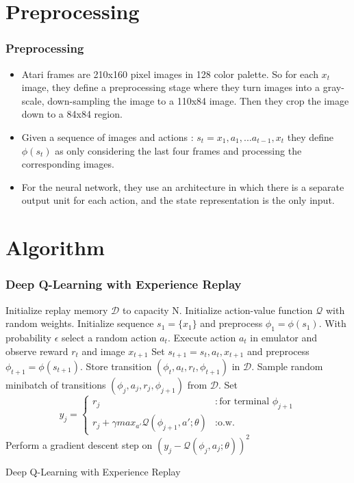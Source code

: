 \documentclass[12pt]{beamer}
\begin{document}
\section{Preprocessing}
\begin{frame}
\frametitle{Preprocessing}
\begin{itemize}
\item Atari frames are 210x160 pixel images in 128 color palette. So for each $x_t$ image, they define a preprocessing stage where they turn images into a gray-scale, down-sampling the image to a 110x84 image. Then they crop the image down to a 84x84 region.
\item Given a sequence of images and actions : $s_t = x_1,a_1,...a_{t-1},x_{t}$ they define $\phi(s_t)$ as only considering the last four frames and processing the corresponding images.
\item For the neural network, they use an architecture in which there is a separate output unit for each action, and the state representation is the only input.
\end{itemize}
\end{frame}

\section{Algorithm}
\begin{frame}
\frametitle{Deep Q-Learning with Experience Replay}
\begin{algorithm}[H]
\begin{algorithmic}[1]
\scriptsize
\STATE Initialize replay memory $\mathcal{D}$ to capacity N.
\STATE Initialize action-value function $\mathcal{Q}$ with random weights.
\STATE Initialize sequence $s_1 = \{x_1\}$ and preprocess $\phi_1 = \phi(s_1)$.
\STATE With probability $\epsilon$ select a random action $a_t$.
\STATE Execute action $a_t$ in emulator and observe reward $r_t$ and image $x_{t+1}$ 
\STATE Set $s_{t+1} = s_t, a_t, x_{t+1}$ and preprocess $\phi_{t+1} = \phi(s_{t+1})$.
\STATE Store transition $(\phi_t, a_t,r_t,\phi_{t+1})$ in $\mathcal{D}$.
\STATE Sample random minibatch of transitions $(\phi_j,a_j,r_j,\phi_{j+1})$ from $\mathcal{D}$.
\STATE Set \begin{displaymath}
   y_j = \left\{
     \begin{array}{lr}
       r_j & : \text{for terminal }\phi_{j+1}\\
       r_j + \gamma max_{a'} \mathcal{Q}(\phi_{j+1},a';\theta) & : \text{o.w.}
     \end{array}
   \right.
\end{displaymath} 
\STATE Perform a gradient descent step on $(y_j-\mathcal{Q}(\phi_j,a_j;\theta))^2$
\ENDFOR
\ENDFOR
\end{algorithmic}
\caption{Deep Q-Learning with Experience Replay}
\label{alg:seq}
\end{algorithm}
\end{frame}
\end{document}
